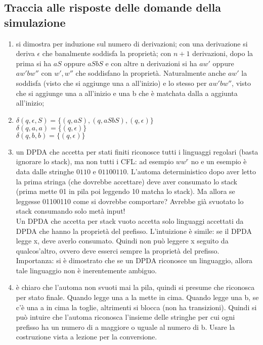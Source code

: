 \documentclass[a4paper,11pt]{article}
\begin{document}
\subsection{Traccia alle risposte delle domande della simulazione}
\begin{enumerate}
    \item si dimostra per induzione sul numero di derivazioni; con una derivazione si deriva $\epsilon$ che banalmente soddisfa la proprietà; con $n+1$ derivazioni, dopo la prima si ha $aS$ oppure $aSbS$ e con altre n derivazioni si ha $aw'$ oppure $aw'bw''$ con $w', w''$ che soddisfano la proprietà. Naturalmente anche $aw'$ la soddisfa (visto che si aggiunge una a all'inizio) e lo stesso per $aw'bw''$, visto che si aggiunge una a all'inizio e una b che è matchata dalla a aggiunta all'inizio;
    \item \begin{minipage}{\linewidth}
        $\delta (q, \epsilon, S) = \{(q,aS), (q,aSbS), (q, \epsilon)\}$\\
        $\delta (q, a, a) = \{(q,\epsilon)\}$\\
        $\delta (q, b, b) = \{(q,\epsilon)\}$\\
    \end{minipage}
    \item un DPDA che accetta per stati finiti riconosce tutti i linguaggi regolari (basta ignorare lo stack), ma non tutti i CFL: ad esempio $ww^r$ no e un esempio è data dalle stringhe $0110$ e $01100110$. L'automa deterministico dopo aver letto la prima stringa (che dovrebbe accettare) deve aver consumato lo stack (prima mette 01 in pila poi leggendo 10 matcha lo stack). Ma allora se leggesse 01100110 come si dovrebbe comportare? Avrebbe già svuotato lo stack consumando solo metà input!\\
    Un DPDA che accetta per stack vuoto accetta solo linguaggi accettati da DPDA che hanno la proprietà del prefisso. L'intuizione è simile: se il DPDA legge x, deve averlo consumato. Quindi non può leggere x seguito da qualcos'altro, ovvero deve esserci sempre la proprietà del prefisso.\\
    Importanza: si è dimostrato che se un DPDA riconosce un linguaggio, allora tale linguaggio non è inerentemente ambiguo.
    \item è chiaro che l'automa non svuoti mai la pila, quindi si presume che riconosca per stato finale. Quando legge una a la mette in cima. Quando legge una b, se c'è una a in cima la toglie, altrimenti si blocca (non ha transizioni). Quindi si può intuire che l'automa riconosca l'insieme delle stringhe per cui ogni prefisso ha un numero di a maggiore o uguale al numero di b. Usare la costruzione vista a lezione per la conversione.

\end{enumerate}
\end{document}
